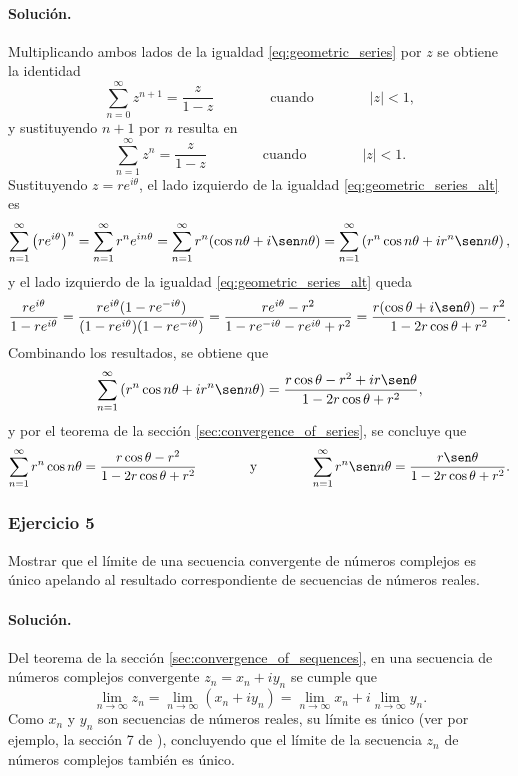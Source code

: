 \documentclass[a4paper]{report}
\begin{document}
\paragraph{Solución.} Multiplicando ambos lados de la igualdad \ref{eq:geometric_series} por \(z\) se obtiene la identidad 
\[
 \sum_{n=0}^\infty z^{n+1}=\frac{z}{1-z}
 \qquad\qquad\textrm{cuando}\qquad\qquad
 |z|<1,
\]
y sustituyendo \(n+1\) por \(n\) resulta en
\begin{equation}\label{eq:geometric_series_alt}
 \sum_{n=1}^\infty z^n=\frac{z}{1-z}
 \qquad\qquad\textrm{cuando}\qquad\qquad
 |z|<1. 
\end{equation}
Sustituyendo \(z=re^{i\theta}\), el lado izquierdo de la igualdad \ref{eq:geometric_series_alt} es
\[
 \sum_{n=1}^\infty\left(re^{i\theta}\right)^n=\sum_{n=1}^\infty r^ne^{in\theta}=\sum_{n=1}^\infty r^n(\cos n\theta+i\sen n\theta)=\sum_{n=1}^\infty\left(r^n\cos n\theta+ir^n\sen n\theta\right),
\]
y el lado izquierdo de la igualdad \ref{eq:geometric_series_alt} queda 
\[
 \frac{re^{i\theta}}{1-re^{i\theta}}=\frac{re^{i\theta}(1-re^{-i\theta})}{(1-re^{i\theta})(1-re^{-i\theta})}
 =\frac{re^{i\theta}-r^2}{1-re^{-i\theta}-re^{i\theta}+r^2}
 =\frac{r(\cos\theta+i\sen\theta)-r^2}{1-2r\cos\theta+r^2}.
\]
Combinando los resultados, se obtiene que 
\[
 \sum_{n=1}^\infty\left(r^n\cos n\theta+ir^n\sen n\theta\right)=\frac{r\cos\theta-r^2+ir\sen\theta}{1-2r\cos\theta+r^2},
\]
y por el teorema de la sección \ref{sec:convergence_of_series}, se concluye que 
\[
 \sum_{n=1}^\infty r^n\cos n\theta=\frac{r\cos\theta-r^2}{1-2r\cos\theta+r^2}
 \qquad\qquad\textrm{y}\qquad\qquad
 \sum_{n=1}^\infty r^n\sen n\theta=\frac{r\sen \theta}{1-2r\cos\theta+r^2}.
\]

\subsubsection{Ejercicio 5}

Mostrar que el límite de una secuencia convergente de números complejos es único apelando al resultado correspondiente de secuencias de números reales.

\paragraph{Solución.} Del teorema de la sección \ref{sec:convergence_of_sequences}, en una secuencia de números complejos convergente \(z_n=x_n+iy_n\) se cumple que 
\[
 \lim_{n\to\infty}z_n=\lim_{n\to\infty}(x_n+iy_n)=\lim_{n\to\infty}x_n+i\lim_{n\to\infty}y_n.
\]
Como \(x_n\) y \(y_n\) son secuencias de números reales, su límite es único (ver por ejemplo, la sección 7 de \cite{kenneth2013elementary}), concluyendo que el límite de la secuencia \(z_n\) de números complejos también es único.
\end{document}
